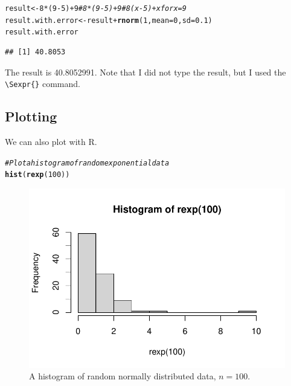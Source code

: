 \documentclass{article}\usepackage[]{graphicx}\usepackage[]{xcolor}
\makeatletter
\def\maxwidth{ %
  \ifdim\Gin@nat@width>\linewidth
    \linewidth
  \else
    \Gin@nat@width
  \fi
}
\newcommand{\hlnum}[1]{\textcolor[rgb]{0.686,0.059,0.569}{#1}}%
\newcommand{\hlcom}[1]{\textcolor[rgb]{0.678,0.584,0.686}{\textit{#1}}}%
\newcommand{\hlopt}[1]{\textcolor[rgb]{0,0,0}{#1}}%
\newcommand{\hldef}[1]{\textcolor[rgb]{0.345,0.345,0.345}{#1}}%
\newcommand{\hlkwb}[1]{\textcolor[rgb]{0.69,0.353,0.396}{#1}}%
\newcommand{\hlkwc}[1]{\textcolor[rgb]{0.333,0.667,0.333}{#1}}%
\newcommand{\hlkwd}[1]{\textcolor[rgb]{0.737,0.353,0.396}{\textbf{#1}}}%
\newenvironment{kframe}{%
 \def\at@end@of@kframe{}%
 \ifinner\ifhmode%
  \def\at@end@of@kframe{\end{minipage}}%
  \begin{minipage}{\columnwidth}%
 \fi\fi%
 \def\FrameCommand##1{\hskip\@totalleftmargin \hskip-\fboxsep
 \colorbox{shadecolor}{##1}\hskip-\fboxsep
     \hskip-\linewidth \hskip-\@totalleftmargin \hskip\columnwidth}%
 \MakeFramed {\advance\hsize-\width
   \@totalleftmargin\z@ \linewidth\hsize
   \@setminipage}}%
 {\par\unskip\endMakeFramed%
 \at@end@of@kframe}
\newenvironment{knitrout}{}{} %
\makeatother
\begin{document}
\begin{multicols}{2}
\begin{knitrout}
\color{fgcolor}\begin{kframe}
\begin{alltt}
\hldef{result} \hlkwb{<-} \hlnum{8}\hlopt{*}\hldef{(}\hlnum{9}\hlopt{-}\hlnum{5}\hldef{)} \hlopt{+} \hlnum{9}  \hlcom{# 8*(9-5) + 9 # 8(x-5) + x for x = 9}
\hldef{result.with.error} \hlkwb{<-} \hldef{result} \hlopt{+} \hlkwd{rnorm}\hldef{(}\hlnum{1}\hldef{,} \hlkwc{mean} \hldef{=} \hlnum{0}\hldef{,} \hlkwc{sd} \hldef{=} \hlnum{0.1}\hldef{)}
\hldef{result.with.error}
\end{alltt}
\begin{verbatim}
## [1] 40.8053
\end{verbatim}
\end{kframe}
\end{knitrout}
\indent The result is 40.8052991. Note that I did not type the result, but I used the \verb|\Sexpr{}| command.
\subsection{Plotting}
We can also plot with R.
\begin{knitrout}\scriptsize
{}\color{fgcolor}\begin{kframe}
\begin{alltt}
\hlcom{#Plot a histogram of random exponential data}
\hlkwd{hist}\hldef{(}\hlkwd{rexp}\hldef{(}\hlnum{100}\hldef{))}
\end{alltt}
\end{kframe}
\end{knitrout}
\begin{figure}[H]
\begin{center}
\begin{knitrout}
\color{fgcolor}
\includegraphics[width=\maxwidth]{figure/unnamed-chunk-6-1} 
\end{knitrout}
\caption{A histogram of random normally distributed data, $n=100$.}
\label{plot1} %
\end{center}
\end{figure}

\end{multicols}
\end{document}
